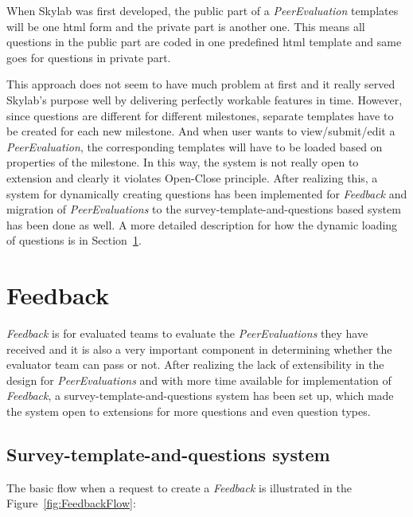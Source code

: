 When Skylab was first developed, the public part of a \textit{PeerEvaluation} templates will be one html form and the private part is another one. This means all questions in the public part are coded in one predefined html template and same goes for questions in private part.

This approach does not seem to have much problem at first and it really served Skylab's purpose well by delivering perfectly workable features in time. However, since questions are different for different milestones, separate templates have to be created for each new milestone. And when user wants to view/submit/edit a \textit{PeerEvaluation}, the corresponding templates will have to be loaded based on properties of the milestone. In this way, the system is not really open to extension and clearly it violates Open-Close principle. After realizing this, a system for dynamically creating questions has been implemented for \textit{Feedback} and migration of \textit{PeerEvaluations} to the survey-template-and-questions based system has been done as well. A more detailed description for how the dynamic loading of questions is in Section~\ref{feedback}.

\section{Feedback} \label{feedback}

\textit{Feedback} is for evaluated teams to evaluate the \textit{PeerEvaluations} they have received and it is also a very important component in determining whether the evaluator team can pass or not. After realizing the lack of extensibility in the design for \textit{PeerEvaluations} and with more time available for implementation of \textit{Feedback}, a survey-template-and-questions system has been set up, which made the system open to extensions for more questions and even question types.

\subsection{Survey-template-and-questions system}

The basic flow when a request to create a \textit{Feedback} is illustrated in the Figure~\ref{fig:FeedbackFlow}:

